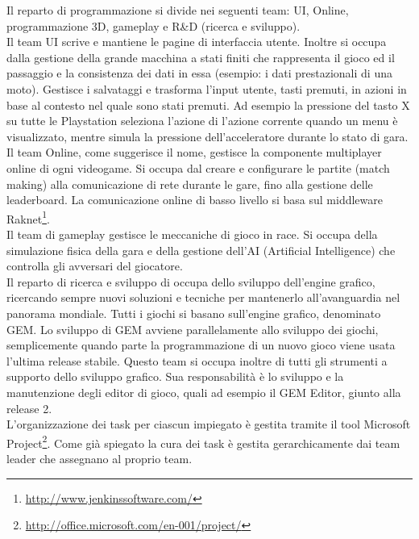 Il reparto di programmazione si divide nei seguenti team: UI, Online, programmazione 3D, gameplay e R\&D (ricerca e sviluppo).\\

Il team UI scrive e mantiene le pagine di interfaccia utente. Inoltre si occupa dalla gestione della grande macchina a stati finiti che rappresenta il gioco ed il passaggio e la consistenza dei dati in essa (esempio: i dati prestazionali di una moto). Gestisce i salvataggi e trasforma l'input utente, tasti premuti, in azioni in base al contesto nel quale sono stati premuti. Ad esempio la pressione del tasto X su tutte le Playstation seleziona l'azione di l'azione corrente quando un menu è visualizzato, mentre simula la pressione dell'acceleratore durante lo stato di gara.\\

Il team Online, come suggerisce il nome, gestisce la componente multiplayer online di ogni videogame. Si occupa dal creare e configurare le partite (match making) alla comunicazione di rete durante le gare, fino alla gestione delle \gls{leaderboard}. La comunicazione online di basso livello si basa sul \gls{middleware} \gls{Raknet}\footnote{\url{http://www.jenkinssoftware.com/}}.\\

Il team di gameplay gestisce le meccaniche di gioco in race. Si occupa della simulazione fisica della gara e della gestione dell'AI (Artificial Intelligence) che controlla gli avversari del giocatore.\\

Il reparto di ricerca e sviluppo di occupa dello sviluppo dell'engine grafico, ricercando sempre nuovi soluzioni e tecniche per mantenerlo all'avanguardia nel panorama mondiale. Tutti i giochi si basano sull'engine grafico, denominato GEM. Lo sviluppo di GEM avviene parallelamente allo sviluppo dei giochi, semplicemente quando parte la programmazione di un nuovo gioco viene usata l'ultima release stabile. Questo team si occupa inoltre di tutti gli strumenti a supporto dello sviluppo grafico. Sua responsabilità è lo sviluppo e la manutenzione degli editor di gioco, quali ad esempio il GEM Editor, giunto alla release 2.\\

L'organizzazione dei task per ciascun impiegato è gestita tramite il tool \gls{Microsoft Project}\footnote{\url{http://office.microsoft.com/en-001/project/}}. Come già spiegato la cura dei task è gestita gerarchicamente dai team leader che assegnano al proprio team.\\

